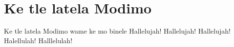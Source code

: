 \starttocol
\chapter{Ke tle latela Modimo}
\nexttocol
\hfill{\it }
\stoptocol
\starttocol
\startlines
{\sc Ke} tle latela Modimo wame ke mo binele 
\hfill Hallelujah!
Hallelujah! Hallelujah!
Halellulah! Halllelulah!
\stoplines
\nexttocol

\stoptocol
